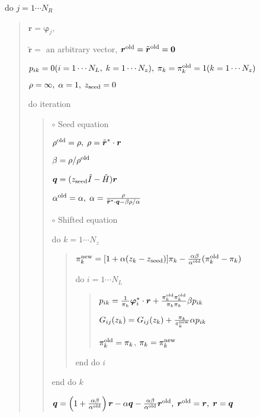 \documentclass[letterpaper,10pt,dvipdfmx,openany]{sphinxmanual}
\begin{document}
do \(j = 1 \cdots N_R\)
\begin{quote}

\({\boldsymbol r} = {\boldsymbol \varphi_j}\),

\({\tilde {\boldsymbol r}} =\) an arbitrary vector,
\({\boldsymbol r}^{\rm old} = {\tilde {\boldsymbol r}}^{\rm old} = {\bf 0}\)

\(p_{i k} = 0(i=1 \cdots N_L,\; k=1 \cdots N_z),\; \pi_k=\pi_k^{\rm old} = 1(k=1 \cdots N_z)\)

\(\rho = \infty,\; \alpha = 1,\; z_{\rm seed}=0\)

do iteration
\begin{quote}

\(\circ\) Seed equation

\(\rho^{\rm old} = \rho,\; \rho = {\tilde {\boldsymbol r}}^* \cdot {\boldsymbol r}\)

\(\beta = \rho / \rho^{\rm old}\)

\({\boldsymbol q} = (z_{\rm seed} {\hat I} - {\hat H}){\boldsymbol r}\)

\(\alpha^{\rm old} = \alpha,\; \alpha = \frac{\rho}{{\tilde {\boldsymbol r}}^*\cdot{\boldsymbol q} - \beta \rho / \alpha }\)

\(\circ\) Shifted equation

do \(k = 1 \cdots N_z\)
\begin{quote}

\(\pi_k^{\rm new} = [1+\alpha(z_k-z_{\rm seed})]\pi_k - \frac{\alpha \beta}{\alpha^{\rm old}}(\pi_k^{\rm old} - \pi_k)\)

do \(i = 1 \cdots N_L\)
\begin{quote}

\(p_{i k} = \frac{1}{\pi_k} {\boldsymbol \varphi}_i^* \cdot {\boldsymbol r} + \frac{\pi^{\rm old}_k \pi^{\rm old}_k}{\pi_k \pi_k} \beta p_{i k}\)

\(G_{i j}(z_k) = G_{i j}(z_k) + \frac{\pi_k}{\pi_k^{\rm new}} \alpha p_{i k}\)

\(\pi_k^{\rm old} = \pi_k\), \(\pi_k = \pi_k^{\rm new}\)
\end{quote}

end do \(i\)
\end{quote}

end do \(k\)

\({\boldsymbol q} = \left( 1 + \frac{\alpha \beta}{\alpha^{\rm old}} \right) {\boldsymbol r} - \alpha {\boldsymbol q} - \frac{\alpha \beta}{\alpha^{\rm old}} {\boldsymbol r}^{\rm old},\; {\boldsymbol r}^{\rm old} = {\boldsymbol r},\; {\boldsymbol r} = {\boldsymbol q}\)


\end{quote}
\end{quote}
\end{document}
